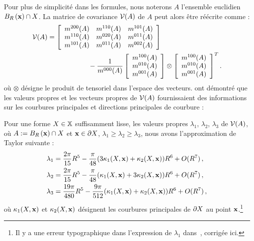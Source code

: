 Pour plus de simplicité dans les formules, nous noterons $A$ l'ensemble
euclidien $B_{R}\left(\mathbf{x}\right) \cap X$. La matrice de covariance $\mathcal{V}(A)$ de
$A$ peut alors être réécrite comme :
\begin{align}
  \mathcal{V}(A) &=  \left\lbrack
    \begin{array}{ccc}
      m^{200}(A) & m^{110}(A) & m^{101}(A)\\
      m^{110}(A) & m^{020}(A) & m^{011}(A)\\
      m^{101}(A) & m^{011}(A) & m^{002}(A)
    \end{array}
    \right\rbrack\quad\quad\quad\quad\quad\quad \nonumber \\
    &\quad\quad\quad\quad\quad\quad- \frac{1}{m^{000}(A)}
    \left\lbrack
    \begin{array}{c}
      m^{100}(A) \\
      m^{010}(A) \\
      m^{001}(A) \\
    \end{array}
    \right\rbrack
    \otimes
    \left\lbrack
    \begin{array}{c}
      m^{100}(A) \\
      m^{010}(A) \\
      m^{001}(A) \\
    \end{array}
    \right\rbrack^T.
\label{eq:defCov}
\end{align}
%
où $\otimes$ désigne le produit de tensoriel dans l'espace des vecteurs.
%
 ont démontré que les valeurs propres et les
vecteurs propres de $\mathcal{V}(A)$ fournissaient des informations sur les courbures
principales et directions principales de courbure :
%
\begin{lemma}
 \label{lem:pottmann-3d}
 Pour une forme $X \in \mathbb{X}$ suffisamment lisse, les valeurs propres $\lambda_1$,
 $\lambda_2$, $\lambda_3$ de $\mathcal{V}(A)$, où $ A := B_{R}\left(\mathbf{x}\right) \cap
 X$ et $\mathbf{x} \in \partial X$, $\lambda_1 \ge \lambda_2 \ge
 \lambda_3$, nous avons l'approximation de Taylor suivante :
 \begin{align}
   \lambda_1& = \frac{2\pi}{15}R^5 - \frac{\pi}{48}(3\kappa_{1}(X,\mathbf{x}) + \kappa_{2}(X,\mathbf{x}))R^6 + O(R^7)\,,\\
   \lambda_2& = \frac{2\pi}{15}R^5 - \frac{\pi}{48}(\kappa_{1}(X,\mathbf{x}) + 3\kappa_{2}(X,\mathbf{x}))R^6 + O(R^7)\,,\\
   \lambda_3& = \frac{19\pi}{480}R^5 - \frac{9\pi}{512}(\kappa_{1}(X,\mathbf{x}) + \kappa_{2}(X,\mathbf{x}))R^6 + O(R^7)\,,
 \end{align}
 où $\kappa_{1}(X,\mathbf{x})$ et $\kappa_{2}(X,\mathbf{x})$ désignent les
 courbures principales de  $\partial X$ au point $\mathbf{x}$.\footnote{Il y a une
 erreur typographique dans l'expression de $\lambda_1$ dans~\cite{Pottmann2007}, corrigée ici.}
\end{lemma}
